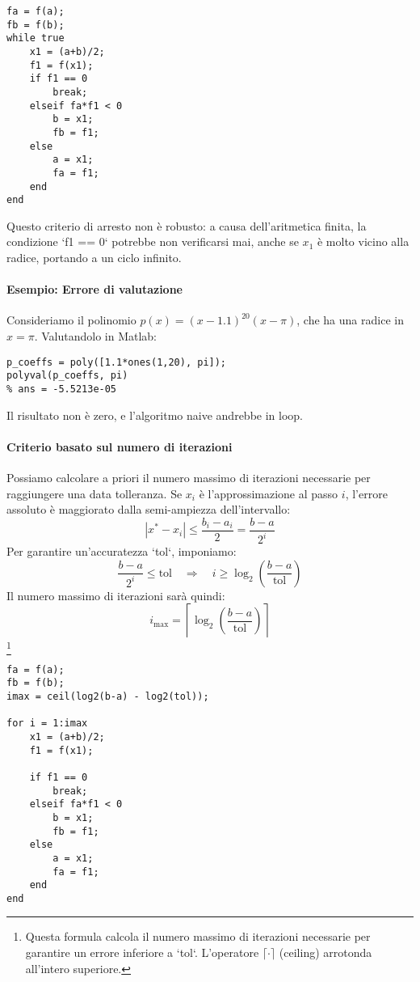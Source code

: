\begin{lstlisting}
fa = f(a);
fb = f(b);
while true
    x1 = (a+b)/2;
    f1 = f(x1);
    if f1 == 0
        break;
    elseif fa*f1 < 0
        b = x1;
        fb = f1;
    else
        a = x1;
        fa = f1;
    end
end
\end{lstlisting}

Questo criterio di arresto non è robusto: a causa dell'aritmetica finita, la condizione `f1 == 0` potrebbe non verificarsi mai, anche se $x_1$ è molto vicino alla radice, portando a un ciclo infinito.

\paragraph{Esempio: Errore di valutazione}
Consideriamo il polinomio $p(x)=(x-1.1)^{20}(x-\pi)$, che ha una radice in $x=\pi$.  
Valutandolo in Matlab:
\begin{lstlisting}
p_coeffs = poly([1.1*ones(1,20), pi]);
polyval(p_coeffs, pi)
% ans = -5.5213e-05
\end{lstlisting}
Il risultato non è zero, e l'algoritmo naive andrebbe in loop.

\paragraph{Criterio basato sul numero di iterazioni}
Possiamo calcolare a priori il numero massimo di iterazioni necessarie per raggiungere una data tolleranza.  
Se $x_i$ è l'approssimazione al passo $i$, l'errore assoluto è maggiorato dalla semi-ampiezza dell'intervallo:
\[
|x^* - x_i| \le \frac{b_i - a_i}{2} = \frac{b-a}{2^i}
\]
Per garantire un'accuratezza `tol`, imponiamo:
\[
\frac{b-a}{2^i} \le \text{tol}
\quad \Rightarrow \quad
i \ge \log_2\!\left(\frac{b-a}{\text{tol}}\right)
\]
Il numero massimo di iterazioni sarà quindi:
\[
i_{\max} = \left\lceil \log_2\!\left(\frac{b-a}{\text{tol}}\right) \right\rceil
\]
\footnote{Questa formula calcola il numero massimo di iterazioni necessarie per garantire un errore inferiore a `tol`. L'operatore $\lceil \cdot \rceil$ (ceiling) arrotonda all'intero superiore.}

\begin{lstlisting}
fa = f(a);
fb = f(b);
imax = ceil(log2(b-a) - log2(tol));

for i = 1:imax
    x1 = (a+b)/2;
    f1 = f(x1);
    
    if f1 == 0
        break;
    elseif fa*f1 < 0
        b = x1;
        fb = f1;
    else
        a = x1;
        fa = f1;
    end
end
\end{lstlisting}

